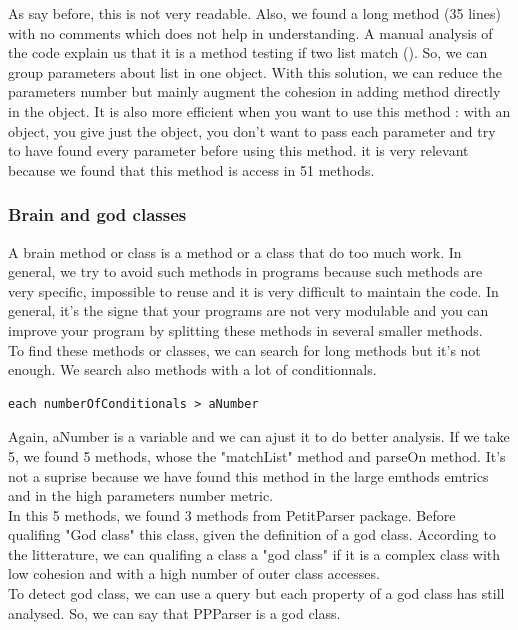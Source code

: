 As say before, this is not very readable.  Also, we found a long method (35 lines) with no comments which does not help in understanding.  A manual analysis of the code explain us that it is a method testing if two list match ().  So, we can group parameters about list in one object.  With this solution, we can reduce the parameters number but mainly augment the cohesion in adding method directly in the object.  It is also more efficient when you want to use this method : with an object, you give just the object, you don't want to pass each parameter and try to have found every parameter before using this method.  it is very relevant because we found that this method is access in 51 methods.\\

\subsubsection{Brain and god classes}
A brain method or class is a method or a class that do too much work.  In general, we try to avoid such methods in programs because such methods are very specific, impossible to reuse and it is very difficult to maintain the code.  In general, it's the signe that your programs are not very modulable and you can improve your program by splitting these methods in several smaller methods.\\
To find these methods or classes, we can search for long methods but it's not enough.  We search also methods with a lot of conditionnals.\\ 
\begin{lstlisting}
each numberOfConditionals > aNumber
\end{lstlisting}
Again, aNumber is a variable and we can ajust it to do better analysis.  If we take 5, we found 5 methods, whose the "matchList" method and parseOn method.  It's not a suprise because we have found this method in the large emthods emtrics and in the high parameters number metric.\\
In this 5 methods, we found 3 methods from PetitParser package.  Before qualifing "God class" this class, given the definition of a god class.  According to the litterature, we can qualifing a class a "god class" if it is a complex class with low cohesion and with a high number of outer class accesses.\\
To detect god class, we can use a query but each property of a god class has still analysed.  So, we can say that PPParser is a god class.\\





